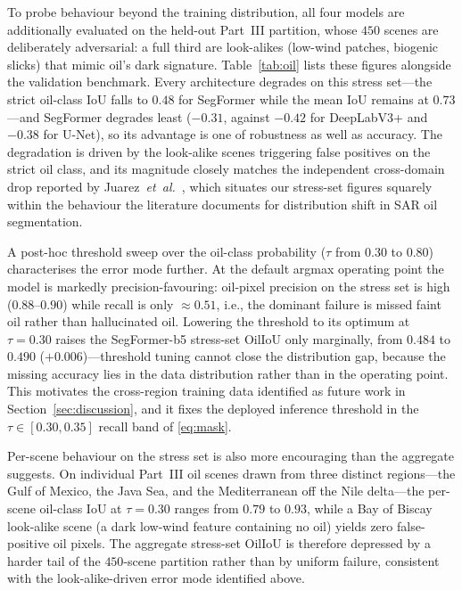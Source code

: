 \documentclass{ieeeaccess}
\begin{document}
To probe behaviour beyond the training distribution, all four models are additionally evaluated on the held-out Part~III partition, whose $450$ scenes are deliberately adversarial: a full third are look-alikes (low-wind patches, biogenic slicks) that mimic oil's dark signature. Table~\ref{tab:oil} lists these figures alongside the validation benchmark. Every architecture degrades on this stress set---the strict oil-class IoU falls to $0.48$ for SegFormer while the mean IoU remains at $0.73$---and SegFormer degrades least ($-0.31$, against $-0.42$ for DeepLabV3+ and $-0.38$ for U-Net), so its advantage is one of robustness as well as accuracy. The degradation is driven by the look-alike scenes triggering false positives on the strict oil class, and its magnitude closely matches the independent cross-domain drop reported by Juarez~\textit{et~al.}~\cite{14}, which situates our stress-set figures squarely within the behaviour the literature documents for distribution shift in SAR oil segmentation.

A post-hoc threshold sweep over the oil-class probability ($\tau$ from $0.30$ to $0.80$) characterises the error mode further. At the default argmax operating point the model is markedly precision-favouring: oil-pixel precision on the stress set is high ($0.88$--$0.90$) while recall is only $\approx0.51$, i.e., the dominant failure is missed faint oil rather than hallucinated oil. Lowering the threshold to its optimum at $\tau=0.30$ raises the SegFormer-b5 stress-set OilIoU only marginally, from $0.484$ to $0.490$ ($+0.006$)---threshold tuning cannot close the distribution gap, because the missing accuracy lies in the data distribution rather than in the operating point. This motivates the cross-region training data identified as future work in Section~\ref{sec:discussion}, and it fixes the deployed inference threshold in the $\tau\in[0.30,0.35]$ recall band of \eqref{eq:mask}.

Per-scene behaviour on the stress set is also more encouraging than the aggregate suggests. On individual Part~III oil scenes drawn from three distinct regions---the Gulf of Mexico, the Java Sea, and the Mediterranean off the Nile delta---the per-scene oil-class IoU at $\tau=0.30$ ranges from $0.79$ to $0.93$, while a Bay of Biscay look-alike scene (a dark low-wind feature containing no oil) yields zero false-positive oil pixels. The aggregate stress-set OilIoU is therefore depressed by a harder tail of the $450$-scene partition rather than by uniform failure, consistent with the look-alike-driven error mode identified above.
\end{document}
